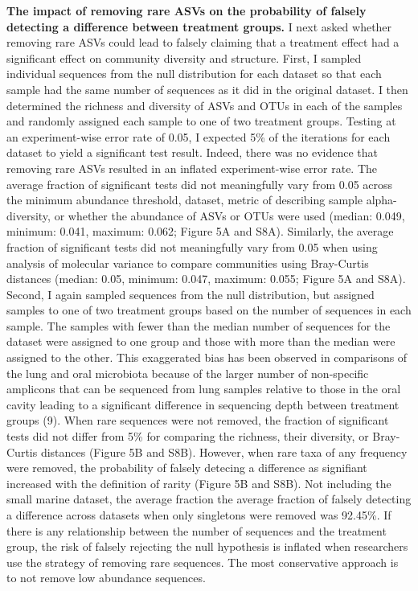 \documentclass[
]{article}
\begin{document}
\textbf{The impact of removing rare ASVs on the probability of falsely
detecting a difference between treatment groups.} I next asked whether
removing rare ASVs could lead to falsely claiming that a treatment
effect had a significant effect on community diversity and structure.
First, I sampled individual sequences from the null distribution for
each dataset so that each sample had the same number of sequences as it
did in the original dataset. I then determined the richness and
diversity of ASVs and OTUs in each of the samples and randomly assigned
each sample to one of two treatment groups. Testing at an
experiment-wise error rate of 0.05, I expected 5\% of the iterations for
each dataset to yield a significant test result. Indeed, there was no
evidence that removing rare ASVs resulted in an inflated experiment-wise
error rate. The average fraction of significant tests did not
meaningfully vary from 0.05 across the minimum abundance threshold,
dataset, metric of describing sample alpha-diversity, or whether the
abundance of ASVs or OTUs were used (median: 0.049, minimum: 0.041,
maximum: 0.062; Figure 5A and S8A). Similarly, the average fraction of
significant tests did not meaningfully vary from 0.05 when using
analysis of molecular variance to compare communities using Bray-Curtis
distances (median: 0.05, minimum: 0.047, maximum: 0.055; Figure 5A and
S8A). Second, I again sampled sequences from the null distribution, but
assigned samples to one of two treatment groups based on the number of
sequences in each sample. The samples with fewer than the median number
of sequences for the dataset were assigned to one group and those with
more than the median were assigned to the other. This exaggerated bias
has been observed in comparisons of the lung and oral microbiota because
of the larger number of non-specific amplicons that can be sequenced
from lung samples relative to those in the oral cavity leading to a
significant difference in sequencing depth between treatment groups (9).
When rare sequences were not removed, the fraction of significant tests
did not differ from 5\% for comparing the richness, their diversity, or
Bray-Curtis distances (Figure 5B and S8B). However, when rare taxa of
any frequency were removed, the probability of falsely detecing a
difference as signifiant increased with the definition of rarity (Figure
5B and S8B). Not including the small marine dataset, the average
fraction the average fraction of falsely detecting a difference across
datasets when only singletons were removed was 92.45\%. If there is any
relationship between the number of sequences and the treatment group,
the risk of falsely rejecting the null hypothesis is inflated when
researchers use the strategy of removing rare sequences. The most
conservative approach is to not remove low abundance sequences.
\end{document}

